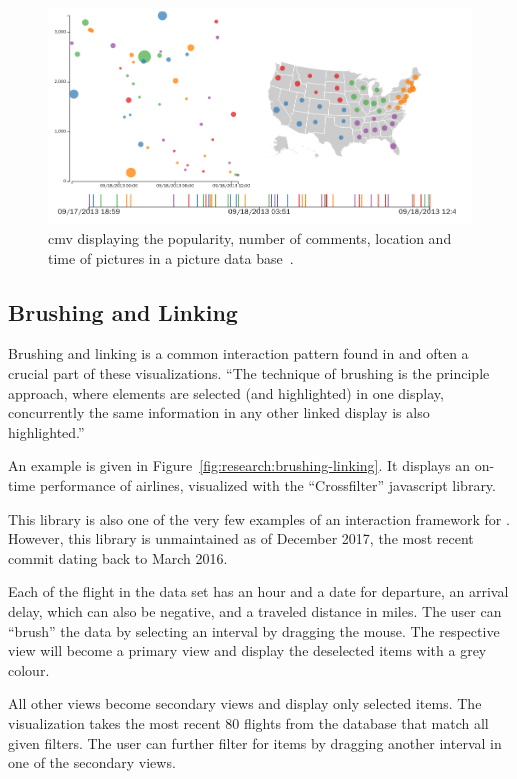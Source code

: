 \begin{figure}
  \centering
  \includegraphics[width=\textwidth]{figures/related-work/cmv}
  \caption{\gls{cmv} displaying the popularity, number of comments, location and time of pictures in a picture data base~\parencite{Dukevis2017}.}
  \label{fig:related-work:cmv}
\end{figure}

\subsection{Brushing and Linking}
Brushing and linking is a common interaction pattern found in \cmvs{} and often a crucial part of these visualizations.
``The technique of brushing is the principle approach, where elements are selected (and highlighted) in one display, concurrently the same information in any other linked display is also highlighted.''~\parencite{Roberts2007}

An example is given in Figure~\ref{fig:research:brushing-linking}.
It displays an on-time performance of airlines, visualized with the ``Crossfilter'' javascript library.

This library is also one of the very few examples of an interaction framework for \cmvs{}.
However, this library is unmaintained as of December 2017, the most recent commit dating back to March 2016.

Each of the flight in the data set has an hour and a date for departure, an arrival delay, which can also be negative, and a traveled distance in miles.
The user can ``brush'' the data by selecting an interval by dragging the mouse.
The respective view will become a primary view and display the deselected items with a grey colour.

All other views become secondary views and display only selected items.
The visualization takes the most recent 80 flights from the database that match all given filters.
The user can further filter for items by dragging another interval in one of the secondary views.

